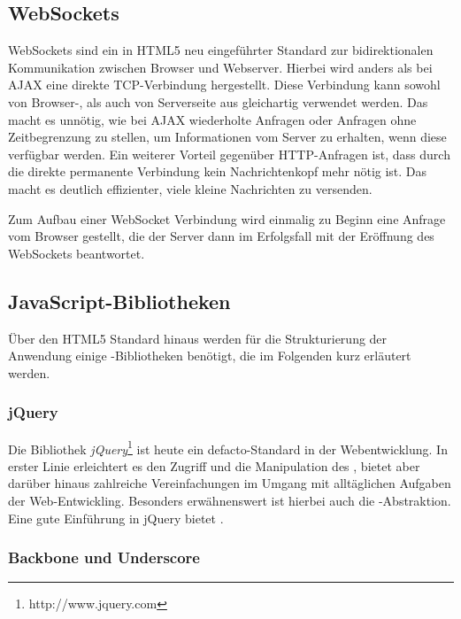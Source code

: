 \subsection{WebSockets}

WebSockets sind ein in HTML5 neu eingeführter Standard zur bidirektionalen  Kommunikation zwischen
Browser und Webserver. Hierbei wird anders als bei  AJAX eine direkte TCP-Verbindung hergestellt.
Diese Verbindung kann sowohl von  Browser-, als auch von Serverseite aus gleichartig verwendet
werden. Das macht es  unnötig, wie bei AJAX wiederholte Anfragen oder Anfragen ohne Zeitbegrenzung
zu  stellen, um Informationen vom Server zu erhalten, wenn diese verfügbar werden. Ein weiterer
Vorteil gegenüber HTTP-Anfragen ist, dass durch die direkte permanente Verbindung kein
Nachrichtenkopf mehr nötig ist. Das macht es deutlich  effizienter, viele kleine Nachrichten zu
versenden.

Zum Aufbau einer WebSocket Verbindung wird einmalig zu Beginn eine  Anfrage vom Browser
gestellt, die der Server dann im Erfolgsfall mit der Eröffnung des WebSockets beantwortet.
\cite{websockets}

\clearpage

\subsection{JavaScript-Bibliotheken}

Über den HTML5 Standard hinaus werden für die Strukturierung der Anwendung einige
-Bibliotheken benötigt, die im Folgenden kurz erläutert werden.

\subsubsection{jQuery}

Die Bibliothek \textit{jQuery}\footnote{http://www.jquery.com} ist heute ein defacto-Standard in der
Webentwicklung. In erster Linie erleichtert es den Zugriff und die Manipulation des ,
bietet aber darüber hinaus zahlreiche Vereinfachungen im Umgang mit alltäglichen Aufgaben der
Web-Entwickling. Besonders erwähnenswert ist hierbei auch die -Abstraktion. Eine gute
Einführung in jQuery bietet \cite{jquery}.

\subsubsection{Backbone und Underscore}

